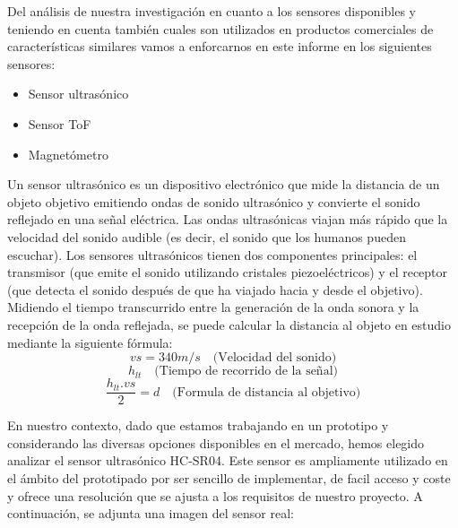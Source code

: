 Del análisis de nuestra investigación en cuanto a los sensores disponibles y teniendo en cuenta también cuales son utilizados en productos comerciales de características similares vamos a enforcarnos en este informe en los siguientes sensores:
\begin{itemize}
    \item Sensor ultrasónico
    \item Sensor ToF
    \item Magnetómetro
    \end{itemize}
Un sensor ultrasónico es un dispositivo electrónico que mide la distancia de un objeto
objetivo emitiendo ondas de sonido ultrasónico y convierte el sonido reflejado en una
señal eléctrica. Las ondas ultrasónicas viajan más rápido que la velocidad del sonido
audible (es decir, el sonido que los humanos pueden escuchar). Los sensores ultrasónicos
tienen dos componentes principales: el transmisor (que emite el sonido utilizando
cristales piezoeléctricos) y el receptor (que detecta el sonido después de que ha
viajado hacia y desde el objetivo). Midiendo el tiempo transcurrido entre la generación de la onda sonora y la recepción de la onda reflejada, se puede calcular la distancia al objeto en estudio mediante la
siguiente fórmula:
\begin{equation}
    vs = 340 m/s \quad\text{(Velocidad del sonido)}\label{eqn:velocidad_del_sonido}
\end{equation}
\begin{equation}
    h_{lt} \quad\text{(Tiempo de recorrido de la señal)} \label{eqn:tiempo_recorrido_señal}
\end{equation}
\begin{equation}
    \frac{h_{lt} . vs}{2} = d \quad\text{(Formula de distancia al objetivo)} \label{eqn:distancia_de_la_onda}
\end{equation}

En nuestro contexto, dado que estamos trabajando en un prototipo y considerando las diversas opciones disponibles en el mercado, hemos elegido analizar el sensor ultrasónico HC-SR04. Este sensor es ampliamente utilizado en el ámbito del prototipado por ser sencillo de implementar, de facil acceso y coste y ofrece una resolución que se ajusta a los requisitos de nuestro proyecto. A continuación, se adjunta una imagen del sensor real:


